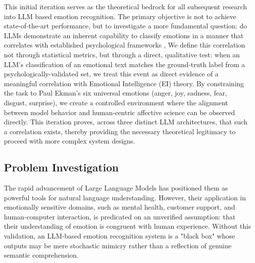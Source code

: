 This initial iteration serves as the theoretical bedrock for all subsequent research into LLM based emotion recognition. The primary objective is not to achieve state-of-the-art performance, but to investigate a more fundamental question: do LLMs demonstrate an inherent capability to classify emotions in a manner that correlates with established psychological frameworks , We define this correlation not through statistical metrics, but through a direct, qualitative test: when an LLM's classification of an emotional text matches the ground-truth label from a psychologically-validated set, we treat this event as direct evidence of a meaningful correlation with Emotional Intelligence (EI) theory. By constraining the task to Paul Ekman's six universal emotions (anger, joy, sadness, fear, disgust, surprise), we create a controlled environment where the alignment between model behavior and human-centric affective science can be observed directly. This iteration proves, across three distinct LLM architectures, that such a correlation exists, thereby providing the necessary theoretical legitimacy to proceed with more complex system designs.

\subsection{Problem Investigation}
The rapid advancement of Large Language Models has positioned them as powerful tools for natural language understanding. However, their application in emotionally sensitive domains, such as mental health, customer support, and human-computer interaction, is predicated on an unverified assumption: that their understanding of emotion is congruent with human experience. Without this validation, an LLM-based emotion recognition system is a "black box" whose outputs may be mere stochastic mimicry rather than a reflection of genuine semantic comprehension.

